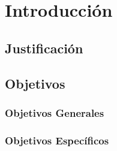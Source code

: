\chapter{Introducci\'on}
\label{cha:introduccion}


\section{Justificación}


\section{Objetivos} %



    \subsection{Objetivos Generales} %
    
    
     
    \subsection{Objetivos Específicos} %
    
    
                
